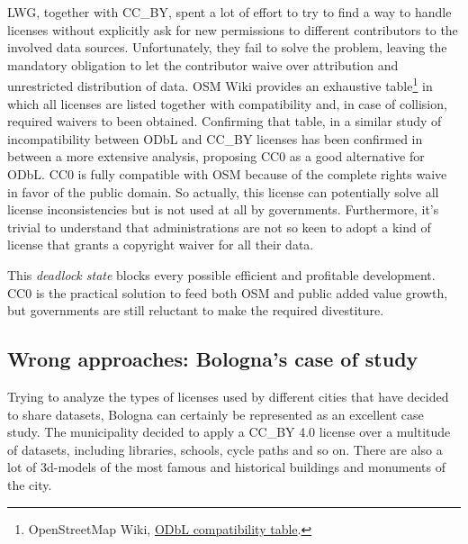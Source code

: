 LWG, together with CC\_BY, spent a lot of effort to try to find a way to handle licenses without explicitly ask for new permissions to different contributors to the involved data sources. Unfortunately, they fail to solve the problem, leaving the mandatory obligation to let the contributor waive over attribution and unrestricted distribution of data.
OSM Wiki provides an exhaustive table\footnote{OpenStreetMap Wiki, \href{https://wiki.openstreetmap.org/wiki/Import/ODbL_Compatibility}{ODbL compatibility table}.} in which all licenses are listed together with compatibility and, in case of collision, required waivers to been obtained. Confirming that table, in \cite{khayyat2015open} a similar study of incompatibility between ODbL and CC\_BY licenses has been confirmed in between a more extensive analysis, proposing CC0 as a good alternative for ODbL.
CC0 is fully compatible with OSM because of the complete rights waive in favor of the public domain. So actually, this license can potentially solve all license inconsistencies but is not used at all by governments. Furthermore, it's trivial to understand that administrations are not so keen to adopt a kind of license that grants a copyright waiver for all their data.

This \textit{deadlock state} blocks every possible efficient and profitable development. CC0 is the practical solution to feed both OSM and public added value growth, but governments are still reluctant to make the required divestiture.  

\subsection{Wrong approaches: Bologna's case of study}
Trying to analyze the types of licenses used by different cities that have decided to share datasets, Bologna can certainly be represented as an excellent case study.
The municipality decided to apply a CC\_BY 4.0 license over a multitude of datasets, including libraries, schools, cycle paths and so on. There are also a lot of 3d-models of the most famous and historical buildings and monuments of the city.

